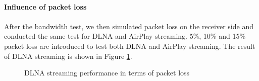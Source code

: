 \\
\textbf{Influence of packet loss}\\
\\
After the bandwidth test, we then simulated packet loss on the receiver side and conducted the same test for DLNA and AirPlay streaming. 5\%, 10\% and 15\% packet loss are introduced to test both DLNA and AirPlay streaming. The result of DLNA streaming is shown in Figure \ref{dlna_pl}. \\
\begin{figure}
\hfill
{}
\hfill
{}
\hfill
{}
\hfill
{}
\hfill
\caption{DLNA streaming performance in terms of packet loss \label{dlna_pl}}
\end{figure}
